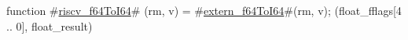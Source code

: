 function #\hyperref[sailRISCVzriscvzyf64ToI64]{riscv\_f64ToI64}# (rm, v) = {
  #\hyperref[sailRISCVzexternzyf64ToI64]{extern\_f64ToI64}#(rm, v);
  (float_fflags[4 .. 0], float_result)
}
